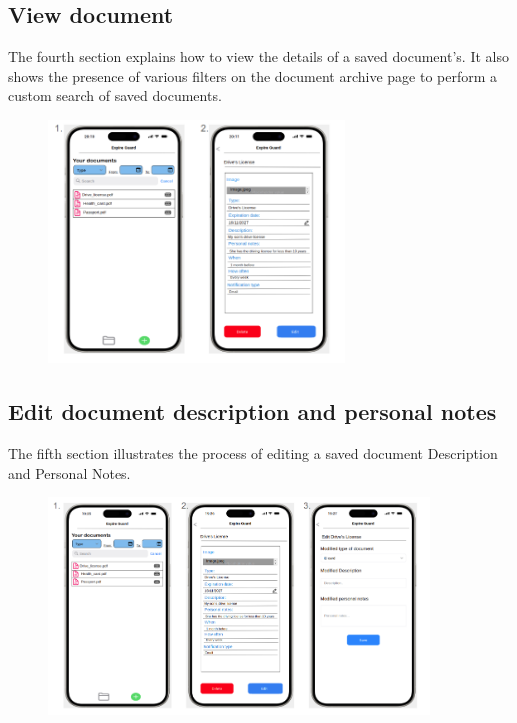 	\subsection{View document}
		The fourth section explains how to view the details of a saved document's. It also shows the presence of various filters on the document archive page to perform a custom search of saved documents.
		\begin{figure}[htbp]
			\centering
			\includegraphics[width=0.7\textwidth]{../mockups/view_doc.png}  %
		\end{figure}
		\clearpage
	\subsection{Edit document description and personal notes}
		The fifth section illustrates the process of editing a saved document Description and Personal Notes.
		\begin{figure}[htbp]
			\centering
			\includegraphics[width=0.9\textwidth]{../mockups/edit_doc_meta_1.png}  %
		\end{figure}
	
